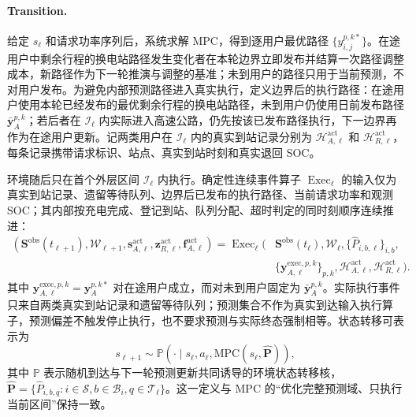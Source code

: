 \documentclass[12pt,a4paper,UTF8]{ctexart}
\begin{document}
\paragraph{Transition.}
给定 $s_\ell$ 和请求功率序列后，系统求解 MPC，得到逐用户最优路径
$\{y_{i,j}^{p,k*}\}$。在途用户中剩余行程的换电站路径发生变化者在本轮边界立即发布并结算一次路径调整成本，新路径作为下一轮推演与调整的基准；未到用户的路径只用于当前预测，不对用户发布。为避免内部预测路径进入真实执行，定义边界后的执行路径：在途用户使用本轮已经发布的最优剩余行程的换电站路径，未到用户仍使用日前发布路径 $\bar{\mathbf y}_{A}^{p,k}$；若后者在 $\mathcal I_\ell$ 内实际进入高速公路，仍先按该已发布路径执行，下一边界再作为在途用户更新。记两类用户在 $\mathcal I_\ell$ 内的真实到站记录分别为 $\mathcal H_{A,\ell}^{\mathrm{act}}$ 和 $\mathcal H_{R,\ell}^{\mathrm{act}}$，每条记录携带请求标识、站点、真实到站时刻和真实退回 SOC。

环境随后只在首个外层区间 $\mathcal I_\ell$ 内执行。确定性连续事件算子 $\operatorname{Exec}_\ell$ 的输入仅为真实到站记录、遗留等待队列、边界后已发布的执行路径、当前请求功率和观测 SOC；其内部按充电完成、登记到站、队列分配、超时判定的同时刻顺序连续推进：
\begin{equation}
\begin{aligned}
(\mathbf S^{\mathrm{obs}}(t_{\ell+1}),\mathcal W_{\ell+1},
\mathbf s_{A,\ell}^{\mathrm{act}},\mathbf z_{R,\ell}^{\mathrm{act}},
\mathbf f_{A,\ell}^{\mathrm{act}})
=\operatorname{Exec}_\ell\!\Big(&
\mathbf S^{\mathrm{obs}}(t_\ell),\mathcal W_\ell,
\{\widehat P_{i,b,\ell}\}_{i,b},\\
&\{\mathbf y_{A,\ell}^{\mathrm{exec},p,k}\}_{p,k},
\mathcal H_{A,\ell}^{\mathrm{act}},\mathcal H_{R,\ell}^{\mathrm{act}}
\Big).
\end{aligned}
\label{eq:actual_execution_operator}
\end{equation}
其中 $\mathbf y_{A,\ell}^{\mathrm{exec},p,k}=\mathbf y_A^{p,k*}$ 对在途用户成立，而对未到用户固定为 $\bar{\mathbf y}_{A}^{p,k}$。实际执行事件只来自两类真实到站记录和遗留等待队列；预测集合不作为真实到达输入执行算子，预测偏差不触发停止执行，也不要求预测与实际终态强制相等。状态转移可表示为
\begin{equation}
s_{\ell+1}
\sim
\mathbb P\!\left(
\cdot\mid
s_\ell,a_\ell,
\mathrm{MPC}(s_\ell,\widehat{\mathbf P})
\right),
\label{eq:rl_transition}
\end{equation}
其中 $\mathbb P$ 表示随机到达与下一轮预测更新共同诱导的环境状态转移核，$\widehat{\mathbf P}=\{\widehat P_{i,b,q}:i\in\mathcal S,b\in\mathcal B_i,q\in\mathcal T_\ell\}$。这一定义与 MPC 的“优化完整预测域、只执行当前区间”保持一致。
\end{document}
